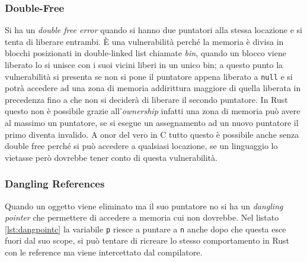 \documentclass{article}
\begin{document}
\subsubsection{Double-Free} \label{sec:double_free}
Si ha un \textit{double free error} \cite[10.4.4]{gollmann:computersecurity} quando si hanno due puntatori alla stessa locazione e si tenta di liberare entrambi. È una vulnerabilità perché la memoria è divisa in blocchi posizionati in double-linked list chiamate \textit{bin}, quando un blocco viene liberato lo si unisce con i suoi vicini liberi in un unico bin; a questo punto la vulnerabilità si presenta se non si pone il puntatore appena liberato a \texttt{null} e si potrà accedere ad una zona di memoria addirittura maggiore di quella liberata in precedenza fino a che non si deciderà di liberare il secondo puntatore. In Rust questo non è possibile grazie all'\textit{ownership} infatti una zona di memoria può avere al massimo un puntatore, se si esegue un assegnamento ad un nuovo puntatore il primo diventa invalido.
A onor del vero in C tutto questo è possibile anche senza double free perché si può accedere a qualsiasi locazione, se un linguaggio lo vietasse però dovrebbe tener conto di questa vulnerabilità.




\subsubsection{Dangling References}
Quando un oggetto viene eliminato ma il suo puntatore no si ha un \textit{dangling pointer} che permettere di accedere a memoria cui non dovrebbe. Nel listato \ref{lst:dangpointc} la variabile \texttt{p} riesce a puntare a \texttt{n} anche dopo che questa esce fuori dal suo scope, si può tentare di ricreare lo stesso comportamento in Rust con le reference \cite[4.2]{rust:language} ma viene intercettato dal compilatore.






\end{document}
